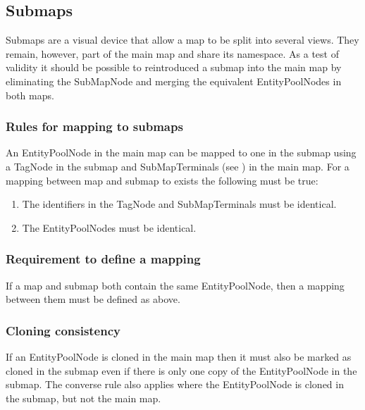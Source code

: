 \subsection{Submaps}

Submaps are a visual device that allow a map to be split into several
views. They remain, however, part of the main map and share its
namespace. As a test of validity it should be possible to reintroduced
a submap into the main map by eliminating the SubMapNode and merging
the equivalent EntityPoolNodes in both maps.

\subsubsection{Rules for mapping to submaps}

An EntityPoolNode in the main map can be mapped to one in the submap
using a TagNode in the submap and SubMapTerminals (see ) in the main map. For a
mapping between map and submap to exists the following must be true:

\begin{enumerate}
\item The identifiers in the TagNode and SubMapTerminals must be identical.
\item The EntityPoolNodes must be identical.
\end{enumerate}

\subsubsection{Requirement to define a mapping}

If a map and submap both contain the same EntityPoolNode, then a
mapping between them must be defined as above.

\subsubsection{Cloning consistency}

If an EntityPoolNode is cloned in the main map then it must also be
marked as cloned in the submap even if there is only one copy of the
EntityPoolNode in the submap. The converse rule also applies where the
EntityPoolNode is cloned in the submap, but not the main map.

